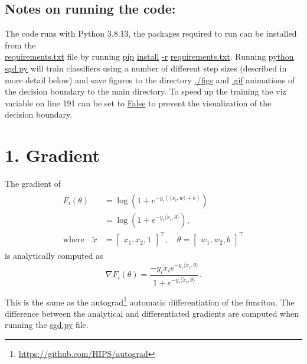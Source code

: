 \documentclass{article}
\begin{document}
\subsection*{Notes on running the code:}
The code runs with Python 3.8.13, the packages required to run can be installed from the \\ \url{requirements.txt} file by running \url{pip} \url{install} \url{-r} \url{requirements.txt}. Running \url{python} \url{sgd.py} will train classifiers using a number of different step sizes (described in more detail below) and save figures to the directory \url{./figs} and \url{.gif} animations of the decision boundary to the main directory. To speed up the training the viz variable on line 191 can be set to \url{False} to prevent the visualization of the decision boundary.
    \section*{1. Gradient}
    The gradient of
    \begin{align}
    \begin{split}
        F_i(\theta) &= \log(1 + e^{-y_i (\langle x_i, w \rangle + b)}) \\
        &= \log(1 + e^{-y_i \langle \tilde{x}_i, \theta \rangle}) , \\ 
        \text{where} \quad \tilde{x} &= \begin{bmatrix}
            x_1, x_2, 1
        \end{bmatrix}^\top, \quad \theta = \begin{bmatrix}
            w_1, w_2, b
        \end{bmatrix}^\top
    \end{split}
\end{align}
is analytically computed as
\begin{equation}
    \nabla F_i(\theta) = \frac{-y_i \tilde{x}_i e^{-y_i\langle \tilde{x}_i, \theta \rangle}}{1 + e^{-y_i \langle \tilde{x}_i, \theta \rangle}}.
\end{equation}

This is the same as the autograd\footnote{\url{https://github.com/HIPS/autograd}} automatic differentiation of the funciton. The difference between the analytical and differentiated gradients are computed when running the \url{sgd.py} file.
\end{document}
